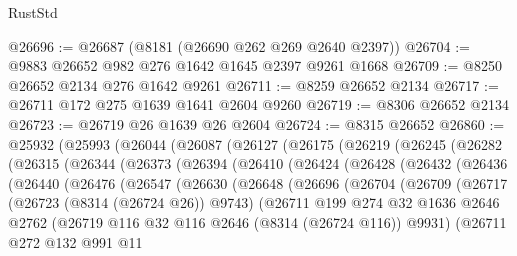 \begin{lexlean}{RustStd}
\begin{coremodule}
@26696 := @26687 (@8181 (@26690 @262 @269 @2640 @2397))
@26704 := @9883 @26652 @982 @276 @1642 @1645 @2397 @9261 @1668
@26709 := @8250 @26652 @2134 @276 @1642 @9261
@26711 := @8259 @26652 @2134
@26717 := @26711 @172 @275 @1639 @1641 @2604 @9260
@26719 := @8306 @26652 @2134
@26723 := @26719 @26 @1639 @26 @2604
@26724 := @8315 @26652
@26860 := @25932
    (@25993
      (@26044
        (@26087
          (@26127
            (@26175
              (@26219
                (@26245
                  (@26282
                    (@26315
                      (@26344
                        (@26373
                          (@26394
                            (@26410
                              (@26424
                                (@26428
                                  (@26432
                                    (@26436
                                      (@26440
                                        (@26476
                                          (@26547
                                            (@26630
                                              (@26648
                                                (@26696
                                                  (@26704
                                                    (@26709
                                                      (@26717
                                                        (@26723 (@8314 (@26724 @26)) @9743)
                                                        (@26711
                                                          @199
                                                          @274
                                                          @32
                                                          @1636
                                                          @2646
                                                          @2762
                                                          (@26719
                                                            @116
                                                            @32
                                                            @116
                                                            @2646
                                                            (@8314 (@26724 @116))
                                                            @9931)
                                                          (@26711
                                                            @272
                                                            @132
                                                            @991
                                                            @11

\end{coremodule}
\end{lexlean}
